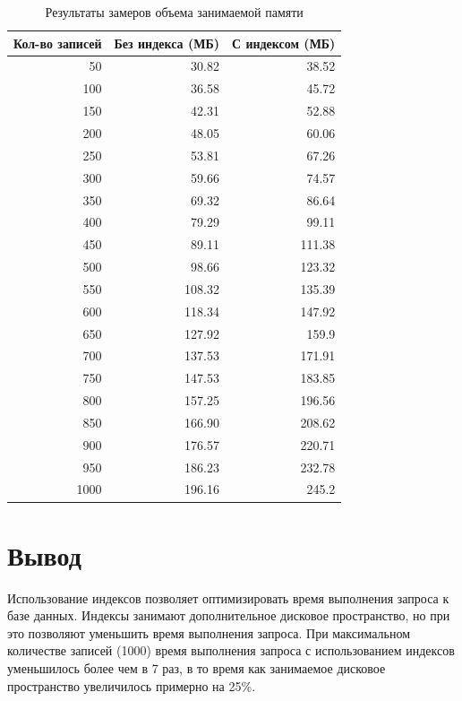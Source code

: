 \begin{table}[H]
    \centering
    \caption{Результаты замеров объема занимаемой памяти}
    \label{tbl:query_time}
    \setlength{\tabcolsep}{4pt} %
    \renewcommand{\arraystretch}{1.1} %
    \begin{tabular}{|r|r|r|}
        \hline
        \textbf{Кол-во записей} & \textbf{Без индекса (МБ)} & \textbf{С индексом (МБ)} \\
        \hline
        50 & 30.82 & 38.52 \\
        \hline
        100 & 36.58 & 45.72 \\
        \hline
        150 & 42.31 & 52.88 \\
        \hline
        200 & 48.05 & 60.06 \\
        \hline
        250 & 53.81 & 67.26 \\
        \hline
        300 & 59.66 & 74.57 \\
        \hline
        350 & 69.32 & 86.64 \\
        \hline
        400 & 79.29 & 99.11 \\
        \hline
        450 & 89.11 & 111.38 \\
        \hline
        500 & 98.66 & 123.32 \\
        \hline
        550 & 108.32 & 135.39 \\
        \hline
        600 & 118.34 & 147.92 \\
        \hline
        650 & 127.92 & 159.9 \\
        \hline
        700 & 137.53 & 171.91 \\
        \hline
        750 & 147.53 & 183.85 \\
        \hline
        800 & 157.25 & 196.56 \\
        \hline
        850 & 166.90 & 208.62 \\
        \hline
        900 & 176.57 & 220.71 \\
        \hline
        950 & 186.23 & 232.78 \\
        \hline
        1000 & 196.16 & 245.2 \\
        \hline
    \end{tabular}
\end{table}

\section*{Вывод}
Использование индексов позволяет оптимизировать время выполнения запроса к базе данных. Индексы занимают дополнительное дисковое пространство, но при это позволяют уменьшить время выполнения запроса. При максимальном количестве записей (1000) время выполнения запроса с использованием индексов уменьшилось более чем в 7 раз, в то время как занимаемое дисковое пространство увеличилось примерно на 25\%.
